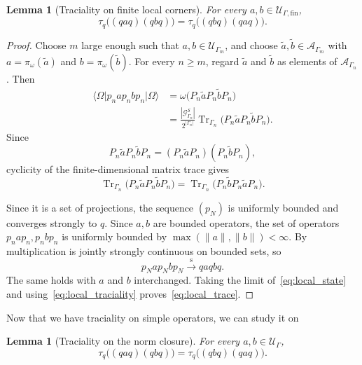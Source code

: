 \documentclass[aps,pra,reprint,superscriptaddress]{revtex4-2}
\newcommand{\cA}{{\mathcal A}}
\newcommand{\cG}{{\mathcal G}}
\newcommand{\cS}{{\mathcal S}}
\newcommand{\cU}{{\mathcal U}}
\newcommand\G{\Gamma}
\newcommand\w{\omega}
\newcommand\W{\Omega}
\providecommand{\ket}[1]{\lvert #1\rangle}
\providecommand{\bra}[1]{\langle #1\rvert}
\providecommand{\Tr}{\operatorname{Tr}}
\providecommand{\norm}[1]{\lVert #1\rVert}
\newtheorem{lemma}[theorem]{Lemma}
\theoremstyle{definition}
\theoremstyle{remark}
\begin{document}
\begin{lemma}[Traciality on finite local corners]\label{lem:finite-trace}
    For every $a,b \in \cU_{\G,\mathrm{fin}}$,
\begin{equation}\label{eq:local_trace}
  \tau_q\bigl((qaq)(qbq)\bigr)
  =
  \tau_q\bigl((qbq)(qaq)\bigr).
\end{equation}
\end{lemma}

\begin{proof}
Choose $m$ large enough such that $a,b\in\cU_{\G_m}$, and choose
$\widetilde a,\widetilde b\in\cA_{\G_m}$ with
$a=\pi_\w(\widetilde a)$ and $b=\pi_\w(\widetilde b)$. For every $n\geq m$,
regard $\widetilde a$ and $\widetilde b$ as elements of $\cA_{\G_n}$. Then
\begin{align}\label{eq:local_state}
  \bra{\W}p_nap_nbp_n\ket{\W}
  &= \omega\bigl(P_n\widetilde aP_n\widetilde bP_n\bigr) \\
  \nonumber
  &= \frac{|\cG^{\cS}_{\G_n}|}{2^{|\G_n|}}
  \Tr_{\G_n}\bigl(P_n\widetilde aP_n\widetilde bP_n\bigr).
\end{align}
Since
\begin{equation}
  P_n\widetilde aP_n\widetilde bP_n
  =(P_n\widetilde aP_n)(P_n\widetilde bP_n),
\end{equation}
cyclicity of the finite-dimensional matrix trace gives
\begin{equation}
  \Tr_{\G_n}\bigl(P_n\widetilde aP_n\widetilde bP_n\bigr)
  =\Tr_{\G_n}\bigl(P_n\widetilde bP_n\widetilde aP_n\bigr).
  \label{eq:local_traciality}
\end{equation}

Since it is a set of projections, the sequence $(p_N)$ is uniformly bounded and
converges strongly to $q$. Since $a,b$ are bounded operators, the set of
operators $p_n a p_n, p_n b p_n$ is uniformly
bounded by $\max(\norm{a},\norm{b})< \infty$.
By \cite[I.3.2.1]{Blackadar} multiplication is jointly strongly continuous on bounded sets, so
\begin{equation}
  p_Nap_Nbp_N
  \xrightarrow{\mathrm{s}}
  qaqbq.
\end{equation}
The same holds with $a$ and $b$ interchanged.  Taking the limit
of~\eqref{eq:local_state} and using~\eqref{eq:local_traciality}
proves~\eqref{eq:local_trace}.
\end{proof}
Now that we have traciality on simple operators, we can study it on 

\begin{lemma}[Traciality on the norm closure]\label{lem:cstar_trace}
For every $a,b\in \cU_\G$,
\begin{equation}\label{eq:Cstar-trace}
  \tau_q\bigl((qaq)(qbq)\bigr)
  =
  \tau_q\bigl((qbq)(qaq)\bigr).
\end{equation}
\end{lemma}
\end{document}
